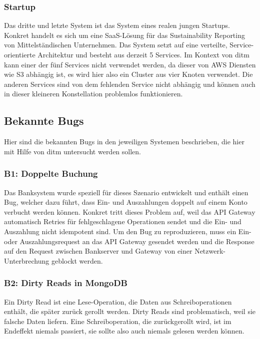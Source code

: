 \documentclass[12pt,a4paper]{report}
\begin{document}
\subsubsection{Startup}
Das dritte und letzte System ist das System eines realen jungen Startups. Konkret handelt es sich um eine SaaS-Lösung für das
Sustainability Reporting von Mittelständischen Unternehmen. Das System setzt auf eine verteilte, Service-orientierte Architektur
und besteht aus derzeit 5 Services. Im Kontext von ditm kann einer der fünf Services nicht verwendet werden, da dieser von AWS
Diensten wie S3 abhängig ist, es wird hier also ein Cluster aus vier Knoten verwendet. Die anderen Services sind von dem
fehlenden Service nicht abhängig und können auch in dieser kleineren Konstellation problemlos funktionieren.

\subsection{Bekannte Bugs}
Hier sind die bekannten Bugs in den jeweiligen Systemen beschrieben, die hier mit Hilfe von ditm untersucht werden sollen.

\subsubsection{B1: Doppelte Buchung}
Das Banksystem wurde speziell für dieses Szenario entwickelt und enthält einen Bug, welcher dazu führt, dass Ein- und Auszahlungen
doppelt auf einem Konto verbucht werden können. Konkret tritt dieses Problem auf, weil das API Gateway automatisch Retries für
fehlgeschlagene Operationen sendet und die Ein- und Auszahlung nicht idempotent sind. Um den Bug zu reproduzieren, muss ein Ein-
oder Auszahlungsrequest an das API Gateway gesendet werden und die Response auf den Request zwischen Bankserver und Gateway
von einer Netzwerk-Unterbrechung geblockt werden.

\subsubsection{B2: Dirty Reads in MongoDB}
Ein Dirty Read ist eine Lese-Operation, die Daten aus Schreiboperationen enthält, die später zurück gerollt werden. Dirty Reads
sind problematisch, weil sie falsche Daten liefern. Eine Schreiboperation, die zurückgerollt wird, ist im Endeffekt niemals
passiert, sie sollte also auch niemals gelesen werden können. \cite{jepsen_mongo_analysis}
\end{document}
